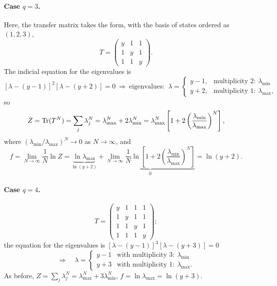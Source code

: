 \paragraph{Case $q = 3$.} Here, the transfer matrix takes the form, with the basis of states ordered as $(1,2,3)$,
\begin{equation}
  T = \begin{pmatrix} y & 1 & 1\\ 1 & y & 1\\ 1 & 1 & y\end{pmatrix}.
\end{equation}
The indicial equation for the eigenvalues is
\begin{equation}
  \left[\lambda-(y-1)\right]^2\left[\lambda-(y+2)\right] = 0
  \ \Rightarrow\ \text{eigenvalues: }\
  \lambda = \begin{cases} y-1, & \text{multiplicity 2}:\ \lambda_{\min}\\ y+2, & \text{multiplicity 1}:\ \lambda_{\max},\end{cases}
\end{equation}
so
\begin{equation}
  Z = \operatorname{Tr}(T^N) = \sum_j\lambda_j^N = \lambda_{\max}^N + 2\lambda_{\min}^N
    = \lambda_{\max}^N\left[1+2\left(\frac{\lambda_{\min}}{\lambda_{\max}}\right)^N\right],
\end{equation}
where $(\lambda_{\min}/\lambda_{\max})^N\to 0$ as $N\to\infty$, and
\begin{equation}
  f = \lim_{N\to\infty}\frac{1}{N}\ln Z = \underbrace{\ln\lambda_{\max}}_{\ln(y+2)}
    + \underbrace{\lim_{N\to\infty}\frac{1}{N}\ln\left[1+2\left(\frac{\lambda_{\min}}{\lambda_{\max}}\right)^N\right]}_{0}
    = \ln(y+2).
\end{equation}

\paragraph{Case $q = 4$.}
\begin{equation}
  T = \begin{pmatrix} y & 1 & 1 & 1\\ 1 & y & 1 & 1\\ 1 & 1 & y & 1\\ 1 & 1 & 1 & y\end{pmatrix};
\end{equation}
the equation for the eigenvalues is $\left[\lambda-(y-1)\right]^3\left[\lambda-(y+3)\right] = 0$
\begin{equation}
  \Rightarrow\quad\lambda = \begin{cases} y-1 & \text{with multiplicity 3}:\ \lambda_{\min}\\ y+3 & \text{with multiplicity 1}:\ \lambda_{\max}.\end{cases}
\end{equation}
As before, $Z = \sum_j\lambda_j^N = \lambda_{\max}^N + 3\lambda_{\min}^N$, $f = \ln\lambda_{\max} = \ln(y+3)$.

